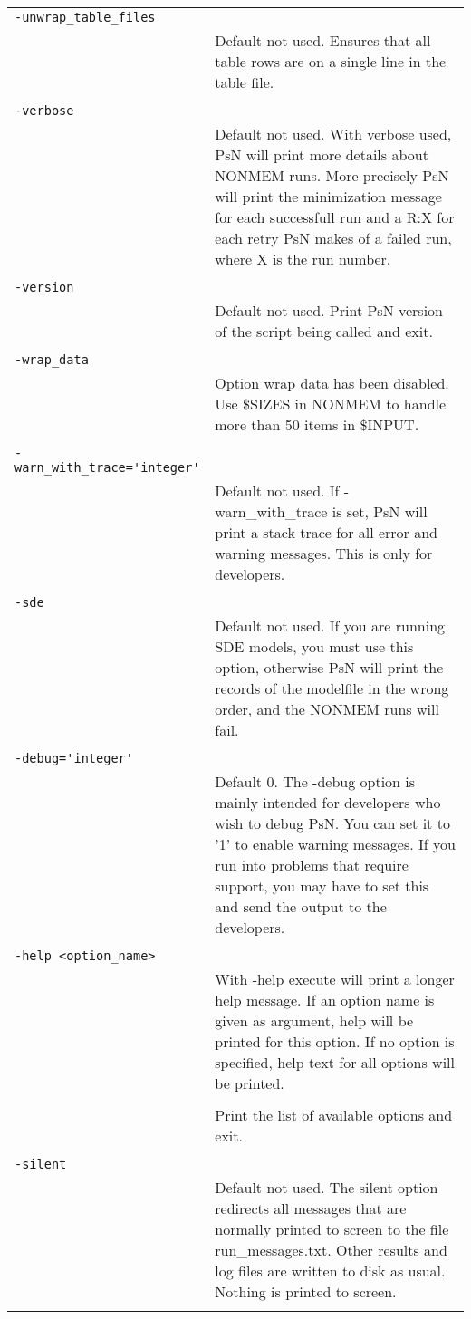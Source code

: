 \documentclass[a4paper,12pt]{article}
\begin{document}
\begin{longtable}{p{1in}p{4in}}
\verb|-unwrap_table_files| & \\
\nopagebreak
 & Default not used. Ensures that all table rows are on a single line in the table file. \\
\\
\verb|-verbose| & \\
\nopagebreak
 & Default not used. With verbose used, PsN will print more details about NONMEM runs. More precisely PsN will print the minimization message for each successfull run and a R:X for each retry PsN makes of a failed run, where X is the run number. \\
\\
\verb|-version| & \\
\nopagebreak
 & Default not used. Print PsN version of the script being called and exit. \\
\\
\verb|-wrap_data| & \\
\nopagebreak
 & Option wrap data has been disabled. Use \$SIZES in NONMEM to handle more than 50 items in \$INPUT. \\
\\
\verb|-warn_with_trace='integer'| & \\
\nopagebreak
 & Default not used. If -warn\_with\_trace is set, PsN will print a stack trace for all error and warning messages. This is only for developers. \\
\\
\verb|-sde| & \\
\nopagebreak
 & Default not used. If you are running SDE models, you must use this option, otherwise PsN will print the records of the modelfile in the wrong order, and the NONMEM runs will fail. \\
\\
\verb|-debug='integer'| & \\
\nopagebreak
 & Default 0. The -debug option is mainly intended for developers who wish to debug PsN. You can set it to '1' to enable warning messages. If you run into problems that require support, you may have to set this and send the output to the developers. \\
\\
\verb|-help <option_name>| & \\
\nopagebreak
 & With -help execute will print a longer help message. If an option name is given as argument, help will be printed for this option. If no option is specified, help text for all options will be printed. \\
\\
\verb%-h or -?% & \\
\nopagebreak
 & Print the list of available options and exit. \\
\\
\verb|-silent| & \\
\nopagebreak
 & Default not used. The silent option redirects all messages that are normally printed to screen to the file run\_messages.txt. Other results and log files are written to disk as usual. Nothing is printed to screen. \\
\\
\end{longtable}
\end{document}
